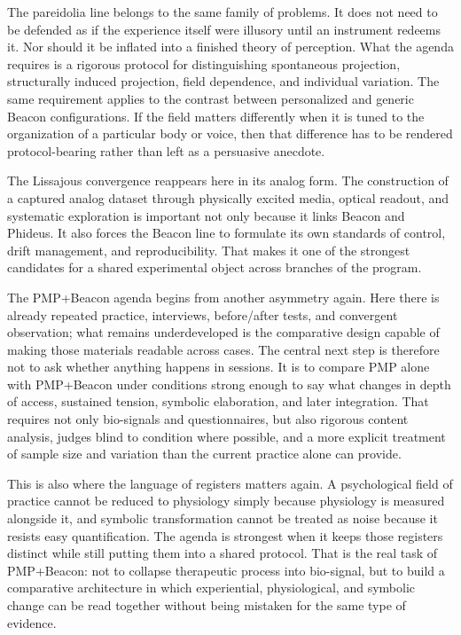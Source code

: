 The pareidolia line belongs to the same family of problems. It does not need to be defended as if the experience itself were illusory until an instrument redeems it. Nor should it be inflated into a finished theory of perception. What the agenda requires is a rigorous protocol for distinguishing spontaneous projection, structurally induced projection, field dependence, and individual variation. The same requirement applies to the contrast between personalized and generic Beacon configurations. If the field matters differently when it is tuned to the organization of a particular body or voice, then that difference has to be rendered protocol-bearing rather than left as a persuasive anecdote.

The Lissajous convergence reappears here in its analog form. The construction of a captured analog dataset through physically excited media, optical readout, and systematic exploration is important not only because it links Beacon and Phideus. It also forces the Beacon line to formulate its own standards of control, drift management, and reproducibility. That makes it one of the strongest candidates for a shared experimental object across branches of the program.

The PMP+Beacon agenda begins from another asymmetry again. Here there is already repeated practice, interviews, before/after tests, and convergent observation; what remains underdeveloped is the comparative design capable of making those materials readable across cases. The central next step is therefore not to ask whether anything happens in sessions. It is to compare PMP alone with PMP+Beacon under conditions strong enough to say what changes in depth of access, sustained tension, symbolic elaboration, and later integration. That requires not only bio-signals and questionnaires, but also rigorous content analysis, judges blind to condition where possible, and a more explicit treatment of sample size and variation than the current practice alone can provide.

This is also where the language of registers matters again. A psychological field of practice cannot be reduced to physiology simply because physiology is measured alongside it, and symbolic transformation cannot be treated as noise because it resists easy quantification. The agenda is strongest when it keeps those registers distinct while still putting them into a shared protocol. That is the real task of PMP+Beacon: not to collapse therapeutic process into bio-signal, but to build a comparative architecture in which experiential, physiological, and symbolic change can be read together without being mistaken for the same type of evidence.


